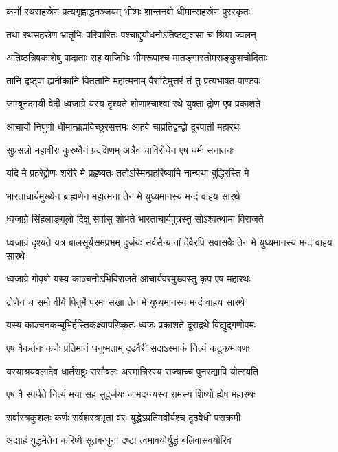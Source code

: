 \twolineshloka
{कर्णो रथसहस्रेण प्रत्यगृह्णाद्धनञ्जयम्}
{भीष्मः शान्तनवो धीमान्सहस्रेण पुरस्कृतः}


\twolineshloka
{तथा रथसहस्रेण भ्रातृभिः परिवारितः}
{पश्चाद्दुर्योधनोऽतिष्ठद्यशसा च श्रिया ज्वलन्}


\twolineshloka
{अतिष्ठन्निवकाशेषु पादाताः सह वाजिभिः}
{भीमरूपाश्च मातङ्गास्तोमराङ्कुशचोदिताः}


\twolineshloka
{तानि दृष्ट्वा ह्यनीकानि विततानि महात्मनाम्}
{वैराटिमुत्तरं तं तु प्रत्यभाषत पाण्डवः}


\twolineshloka
{जाम्बूनदमयी वेदी ध्वजाग्रे यस्य दृश्यते}
{शोणाश्चाश्वा रथे युक्ता द्रोण एष प्रकाशते}


\twolineshloka
{आचार्यो निपुणो धीमान्ब्रह्मविच्छूरसत्तमः}
{आहवे चाप्रतिद्वन्द्वो दूरपाती महारथः}


\twolineshloka
{सुप्रसन्नो महावीरः कुरुष्वैनं प्रदक्षिणम्}
{अत्रैव चाविरोधेन एष धर्मः सनातनः}


\twolineshloka
{यदि मे प्रहरेद्द्रोणः शरीरे मे प्रहृष्यतः}
{ततोऽस्मिन्प्रहरिष्यामि नान्यथा बुद्धिरस्ति मे}


\twolineshloka
{भारताचार्यमुख्येन ब्राह्मणेन महात्मना}
{तेन मे युध्यमानस्य मन्दं वाहय सारथे}


\twolineshloka
{ध्वजाग्रे सिंहलाङ्गूलो दिक्षु सर्वासु शोभते}
{भारताचार्यपुत्रस्तु सोऽश्वत्थामा विराजते}


\threelineshloka
{ध्वजाग्रं दृश्यते यत्र बालसूर्यसमप्रभम्}
{दुर्जयः सर्वसैन्यानां देवैरपि सवासवैः}
{तेन मे युध्यमानस्य मन्दं वाहय सारथे}


\twolineshloka
{ध्वजाग्रे गोवृषो यस्य काञ्चनोऽभिविराजते}
{आचार्यवरमुख्यस्तु कृप एष महारथः}


\twolineshloka
{द्रोणेन च समो वीर्ये पितुर्मे परमः सखा}
{तेन मे युध्यमानस्य मन्दं वाहय सारथे}


\twolineshloka
{यस्य काञ्चनकम्बूभिर्हस्तिकक्ष्यापरिष्कृतः}
{ध्वजः प्रकाशते दूराद्रथे विद्युद्गणोपमः}


\twolineshloka
{एष वैकर्तनः कर्णः प्रतिमानं धनुष्मताम्}
{दृढवैरी सदाऽस्माकं नित्यं कटुकभाषणः}


\twolineshloka
{यस्याश्रयबलादेव धार्तराष्ट्रः ससौबलः}
{अस्मान्निरस्य राज्याच्च पुनरद्यापि योत्स्यति}


\twolineshloka
{एष वै स्पर्धते नित्यं मया सह सुदुर्जयः}
{जामदग्न्यस्य रामस्य शिष्यो ह्येष महारथः}


\twolineshloka
{सर्वास्त्रकुशलः कर्णः सर्वशस्त्रभृतां वरः}
{युद्धेऽप्रतिमवीर्यश्च दृढवेधी पराक्रमी}


\twolineshloka
{अद्याहं युद्धमेतेन करिष्ये सूतबन्धुना}
{द्रष्टा त्वमावयोर्युद्धं बलिवासवयोरिव}


